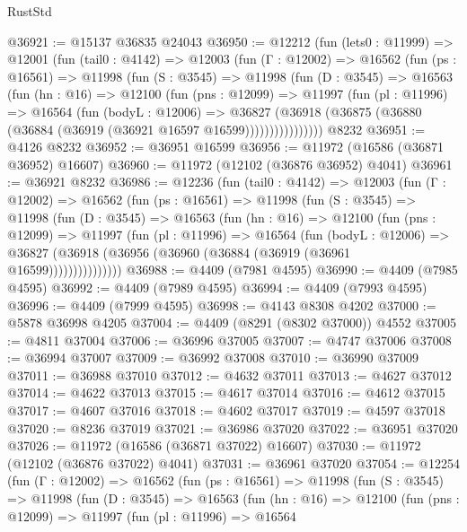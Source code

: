 \begin{lexlean}{RustStd}
\begin{coremodule}
@36921 := @15137 @36835 @24043
@36950 := @12212
    (fun (lets0 : @11999) =>
    @12001
      (fun (tail0 : @4142) =>
      @12003
        (fun (Γ : @12002) =>
        @16562
          (fun (ps : @16561) =>
          @11998
            (fun (S : @3545) =>
            @11998
              (fun (D : @3545) =>
              @16563
                (fun (hn : @16) =>
                @12100
                  (fun (pns : @12099) =>
                  @11997
                    (fun (pl : @11996) =>
                    @16564
                      (fun (bodyL : @12006) =>
                      @36827
                        (@36918
                          (@36875 (@36880 (@36884 (@36919 (@36921 @16597 @16599))))))))))))))))
    @8232
@36951 := @4126 @8232
@36952 := @36951 @16599
@36956 := @11972 (@16586 (@36871 @36952) @16607)
@36960 := @11972 (@12102 (@36876 @36952) @4041)
@36961 := @36921 @8232
@36986 := @12236
    (fun (tail0 : @4142) =>
    @12003
      (fun (Γ : @12002) =>
      @16562
        (fun (ps : @16561) =>
        @11998
          (fun (S : @3545) =>
          @11998
            (fun (D : @3545) =>
            @16563
              (fun (hn : @16) =>
              @12100
                (fun (pns : @12099) =>
                @11997
                  (fun (pl : @11996) =>
                  @16564
                    (fun (bodyL : @12006) =>
                    @36827 (@36918 (@36956 (@36960 (@36884 (@36919 (@36961 @16599)))))))))))))))
@36988 := @4409 (@7981 @4595)
@36990 := @4409 (@7985 @4595)
@36992 := @4409 (@7989 @4595)
@36994 := @4409 (@7993 @4595)
@36996 := @4409 (@7999 @4595)
@36998 := @4143 @8308 @4202
@37000 := @5878 @36998 @4205
@37004 := @4409 (@8291 (@8302 @37000)) @4552
@37005 := @4811 @37004
@37006 := @36996 @37005
@37007 := @4747 @37006
@37008 := @36994 @37007
@37009 := @36992 @37008
@37010 := @36990 @37009
@37011 := @36988 @37010
@37012 := @4632 @37011
@37013 := @4627 @37012
@37014 := @4622 @37013
@37015 := @4617 @37014
@37016 := @4612 @37015
@37017 := @4607 @37016
@37018 := @4602 @37017
@37019 := @4597 @37018
@37020 := @8236 @37019
@37021 := @36986 @37020
@37022 := @36951 @37020
@37026 := @11972 (@16586 (@36871 @37022) @16607)
@37030 := @11972 (@12102 (@36876 @37022) @4041)
@37031 := @36961 @37020
@37054 := @12254
    (fun (Γ : @12002) =>
    @16562
      (fun (ps : @16561) =>
      @11998
        (fun (S : @3545) =>
        @11998
          (fun (D : @3545) =>
          @16563
            (fun (hn : @16) =>
            @12100
              (fun (pns : @12099) =>
              @11997
                (fun (pl : @11996) =>
                @16564

\end{coremodule}
\end{lexlean}
